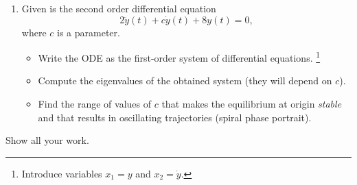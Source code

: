 \documentclass[a4paper,11pt,reqno]{amsart}
\numberwithin{equation}{section}
\begin{document}
\begin{enumerate}[1.]
  \item Given is the second order differential equation \[2 \ddot y (t) + c \dot y(t) + 8 y(t) = 0,\] where \(c\) is a parameter.
      \begin{itemize}
      \item[(i)] Write the ODE as the first-order system of differential
        equations. \footnote{Introduce variables \(x_{1} = y\) and \(x_{2} =
          \dot{y}\).}
      \item[(ii)] Compute the eigenvalues of the obtained system (they will depend on \(c\)).
      \item[(iii)] Find the range of values of \(c\) that makes the equilibrium at origin \emph{stable} and that results in oscillating trajectories (spiral phase portrait).
    \end{itemize}

\end{enumerate}

  \textcolor{red!20}{Show all your work.}
\end{document}
